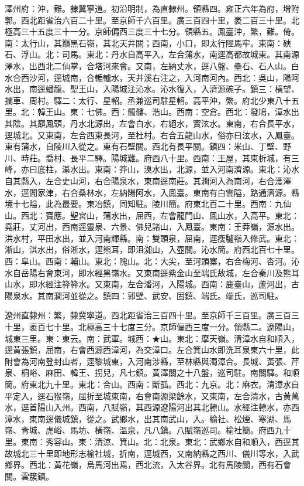 \begin{pinyinscope}
澤州府：沖，難。隸冀寧道。初沿明制，為直隸州。領縣四。雍正六年為府，增附郭。西北距省治六百二十里。至京師千六百里。廣三百四十里，袤二百三十里。北極高三十五度三十一分。京師偏西三度三十七分。領縣五。鳳臺沖，繁，難。倚。南：太行山，其巔黑石嶺，其北天井關；西南，小口，即太行陘馬牢。東南：硤石、浮山。北：司馬。東北：丹水自高平入，左合蒲水，南逕高都故城東。其南源澤水，出西北二仙掌，合塔河來會。又南，左納丈水，逕八盤、壘石、石人山。白水合西沙河，逕城南，合轆轤水，天井溪右注之，入河南河內。西北：吳山，陽阿水出，南逕蟠龍、聖王山，入陽城注沁水。沁水復入，入濟源碗子。鎮三：橫望、攔車、周村。驛二：太行、星軺。丞兼巡司駐星軺。高平沖，繁。府北少東八十五里。北：韓王山。東：七佛。西：髑髏、浩山。西南：空倉。西北：發鳩，漳水出其陰。其巔鳳頭，丹水北源出，左會白水，右絕水，實泫水。東南，右合長平水，逕城北。又東南，左合西東長河，至杜村。右合五龍山水，俗亦曰泫水，入鳳臺。東有蒲水，自陵川入從之。東有石壁關。西北有長平關。鎮四：米山、丁壁、野川、時莊。喬村、長平二驛。陽城難。府西八十里。西南：王屋，其東析城，有三峰，亦曰底柱，濝水出。東南：莽山，溴水出，北源，並入河南濟源。東北：沁水自其縣入，左合史山河，右合陽泉水，東南逕南莊。其澗河入為南河，右合濩澤水，逕閻家津，右合桑林水，左納陽阿水，入鳳臺。東南有白雲隘，路通濟源。縣境十七隘，此為最要。東冶鎮，同知駐。陵川簡。府東北百二十里。西南：九仙山。西北：寶應。聖宮山，蒲水出，屈西，左會龍門山、鳳山水，入高平。東北：堯莊，丈河出，西南逕靈泉、六景、佛兒諸山，入鳳臺。東南：王莽嶺，源水出。洪水村，平田水出，並入河南輝縣。南：雙頭泉，屈南，逕瘦驢嶺入修武。東北：淅山，淇水出，俗淅水，逕熊耳，即沮洳山，入壺關。沁水簡。府西北百七十里。西：阜山。西南：輔山。東北：隗山。北：大尖，至河頭寨，右合梅河、杏河。沁水自岳陽右會東河，即水經黑嶺水。又東南逕紫金山至端氏故城，左合秦川及熊耳山水，即水經注簳簳水。又東南，左合潘河，入陽城。西南：鹿臺山，蘆河出，古陽泉水。其南澗河並從之。鎮四：郭壁、武安、固鎮、端氏。端氏，巡司駐。

遼州直隸州：繁，隸冀寧道。西北距省治三百四十里。至京師千三百里。廣三百三十里，袤百七十里。北極高三十七度三分。京師偏西三度一分。領縣二。遼陽山，城東三里。東：東云。南：武軍。城西：★山。東北：摩天嶺。清漳水自和順入，逕黃張鎮，屈南，右會西源西漳河，為交漳口。左合箕山水即洗耳泉東六十里，此附會為河南登封山者，逕黎城東，入河南涉縣，至林縣與濁漳合。長城、黃張、芹泉、桐峪、麻田、韓王、拐兒，凡七鎮。黃澤關之十八盤，巡司駐。南關驛。和順簡。府東北九十里。東北：合山。西南：斷孤。西北：九京。北：麻衣。清漳水自平定入，逕石猴嶺，屈折至城東南，右會南源梁餘水，又東南，左合清水，古黃萬水，逕首陽山入州。西南，八賦嶺，其西源遼陽河出其北轑山。水經注轑水，亦西漳水，東南逕儀城鎮，從之。武鄉水，出其南武山，入。榆社、松煙、寒湖、馬嶺、青城、虎峪、馬坊、橫嶺、溫泉，凡八鎮。八賦嶺巡司。榆社簡。府西九十里。東南：秀容山。東：清涼、箕山。北：北泉。東北：武鄉水自和順入，西逕其故城北三十里即地形志榆社城，折南，逕城西，又南納縣之西川、儀川等水，入武鄉界。西北：黃花嶺，烏馬河出焉，西北流，入太谷界。北有馬陵關，西有石會關。雲簇鎮。


\end{pinyinscope}
